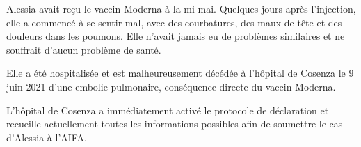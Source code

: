 Alessia avait reçu le vaccin Moderna à la mi-mai. Quelques jours après
l'injection, elle a commencé à se sentir mal, avec des courbatures, des maux de
tête et des douleurs dans les poumons. Elle n'avait jamais eu de problèmes
similaires et ne souffrait d'aucun problème de santé.

Elle a été hospitalisée et est malheureusement décédée à l'hôpital de Cosenza le
9 juin 2021 d'une embolie pulmonaire, conséquence directe du vaccin Moderna.

L'hôpital de Cosenza a immédiatement activé le protocole de déclaration et
recueille actuellement toutes les informations possibles afin de soumettre le
cas d'Alessia à l'AIFA.

